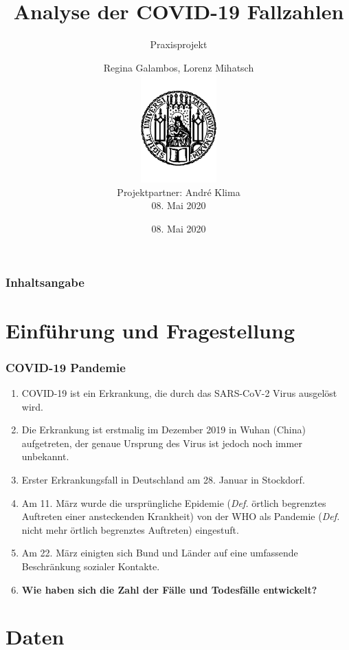 \documentclass{beamer}
\title[Praxisprojekt: COVID-19]{Analyse der COVID-19 Fallzahlen}
\subtitle{Praxisprojekt}
\date{08. Mai 2020}
\author[R.Galambos, L.Mihatsch]{Regina Galambos, Lorenz Mihatsch\\
	\includegraphics[width=0.22\textwidth]{LMU.pdf}\\
	{\small Projektpartner: Andr\'{e} Klima}\\
	{\small 08. Mai 2020}}
\begin{document}
\begin{frame}
	\titlepage
\end{frame}

\begin{frame}
   \frametitle{Inhaltsangabe}
   \tableofcontents
 \end{frame}
 
 
 \section{Einführung und Fragestellung}
 \begin{frame}
 	\frametitle{COVID-19 Pandemie}
 	\begin{enumerate}
 		\item COVID-19 ist ein Erkrankung, die durch das SARS-CoV-2 Virus ausgelöst wird.
 		\item Die Erkrankung ist erstmalig im Dezember 2019 in Wuhan (China) aufgetreten, der genaue Ursprung des Virus ist jedoch noch immer unbekannt.
 		\item Erster Erkrankungsfall in Deutschland am 28. Januar in Stockdorf.
 		\item Am 11. März wurde die ursprüngliche Epidemie (\emph{Def.} örtlich begrenztes Auftreten einer ansteckenden Krankheit) von der WHO als Pandemie (\emph{Def.} nicht mehr örtlich begrenztes Auftreten) eingestuft.
 		\item Am 22. März einigten sich Bund und Länder auf eine umfassende Beschränkung sozialer Kontakte.
 		\pause
 		\item \textbf{Wie haben sich die Zahl der Fälle und Todesfälle entwickelt?}
 	\end{enumerate}
 \end{frame}
 \section{Daten}
  
\end{document}
